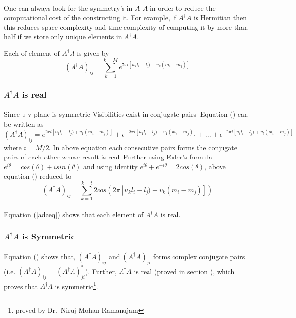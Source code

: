 \paragraph{}One can always look for the symmetry's in $A^ \dagger A$ in order to reduce the computational 
cost of the constructing it. For example, if $A^ \dagger A$ is Hermitian then this
reduces space complexity and time complexity of computing it by more than half if we store 
only unique elements in $A^ \dagger A$.

Each of element of $A^ \dagger A$ is given by 
\begin{equation}
 (A^ \dagger A)_{ij} = \displaystyle\sum\limits_{k=1}^{k=M} e^{2 \pi i [u_k l_i-l_j) + v_k (m_i-m_j)]}
\end{equation}

\subsubsection{$A^\dagger A$ is real}
\paragraph{}Since u-v plane is symmetric Visibilities exist in conjugate pairs. Equation () can be written as
\begin{equation}
 (A^ \dagger A)_{ij} = e^{2 \pi i [u_1 l_i-l_j) + v_1 (m_i-m_j)]} + e^{-2 \pi i [u_1 l_i-l_j) + v_1 (m_i-m_j)]}+ ... +e^{-2 \pi i [u_t l_i-l_j) + v_t (m_i-m_j)]}
\end{equation}
where $t=M/2$. In above equation each consecutive pairs forms the conjugate pairs of each other whose result is real. Further using
Euler's formula $e^{i\theta} = cos(\theta)+ isin(\theta)$ and using identity $e^{i\theta}+e^{-i\theta} = 2cos(\theta)$, above equation () reduced to
\begin{equation}
 (A^ \dagger A)_{ij} = \displaystyle\sum\limits_{k=1}^{k=t} 2 cos(2 \pi [u_k l_i-l_j) + v_k (m_i-m_j)])
\label{adaeq}
\end{equation}
\paragraph{}Equation (\ref{adaeq}) shows that each element of $A^\dagger A$ is real.

\subsubsection{$A^\dagger A$ is Symmetric}
\paragraph{}Equation () shows that, $(A^\dagger A)_{ij}$ and $(A^\dagger A)_{ji}$ forms complex conjugate pairs 
(i.e. $(A^\dagger A)_{ij}$ = $(A^\dagger A)^*_{ji}$). Further, $A^\dagger A$ is real (proved in section ),
which proves that $A^\dagger A$ is symmetric\footnote{proved by Dr.\ Niruj Mohan Ramanujam}.

